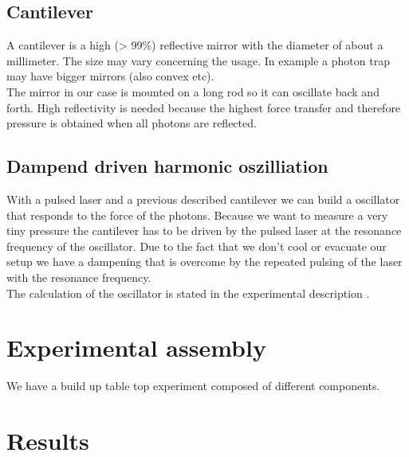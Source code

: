 \documentclass[12pt,a4paper]{article}
\begin{document}
\begin{multicols}{2}
\subsection{Cantilever}
A cantilever is a high (> 99\%) reflective mirror with the diameter of about a millimeter. The size may vary concerning the usage. In example a photon trap may have bigger mirrors (also convex etc).\\ 
The mirror in our case is mounted on a long rod so it can oscillate back and forth.
High reflectivity is needed because the highest force transfer and therefore pressure is obtained when all photons are reflected.

\subsection{Dampend driven harmonic oszilliation}
With a pulsed laser and a previous described cantilever we can build a oscillator that responds to the force of the photons. Because we want to measure a very tiny pressure the cantilever has to be driven by the pulsed laser at the resonance frequency of the oscillator. Due to the fact that we don't cool or evacuate our setup we have a dampening that is overcome by the repeated pulsing of the laser with the resonance frequency.\\
The calculation of the oscillator is stated in the experimental description \cite{physikwiki}.

\section{Experimental assembly}
We have a build up table top experiment composed of different components.

\section{Results}
\cite{github}


\end{multicols}
\end{document}
